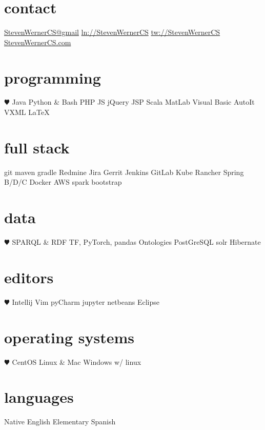 \documentclass[]{friggeri-cv} %
\begin{document}


\begin{aside1} 
\section{contact}
\href{mailto:StevenWernerCS@gmail.com}{StevenWernerCS@gmail}
\href{http://linkedin.com/in/StevenWernerCS}{ln://StevenWernerCS}
\href{http://www.twitter.com/StevenWernerCS}{tw://StevenWernerCS}
\href{http://www.StevenWernerCS.com}{StevenWernerCS.com}
\section{programming}
{\color{red} $\varheartsuit$} Java Python \& Bash
PHP JS jQuery JSP
Scala MatLab 
Visual Basic AutoIt 
VXML {\selectfont \LaTeX}
\section{full stack}
git maven gradle
Redmine Jira Gerrit
Jenkins GitLab
Kube Rancher
Spring B/D/C
Docker AWS
spark bootstrap
\section{data}
{\color{red} $\varheartsuit$} SPARQL \& RDF
TF, PyTorch, pandas
Ontologies
PostGreSQL
solr Hibernate
\section{editors}
{\color{red} $\varheartsuit$} Intellij Vim
pyCharm jupyter
netbeans Eclipse
\section{operating systems}
{\color{red} $\varheartsuit$} CentOS Linux \& Mac 
Windows w/ linux
\section{languages}
Native English
Elementary Spanish
\end{aside1}
\end{document}
